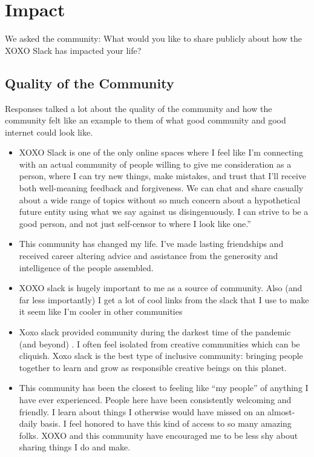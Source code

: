 \documentclass[
]{book}
\providecommand{\tightlist}{%
  \setlength{\itemsep}{0pt}\setlength{\parskip}{0pt}}
\begin{document}
\chapter{Impact}\label{impact}

We asked the community: What would you like to share publicly about how the XOXO Slack has impacted your life?

\section{Quality of the Community}\label{quality-of-the-community}

Responses talked a lot about the quality of the community and how the community felt like an example to them of what good community and good internet could look like.

\begin{itemize}
\tightlist
\item
  XOXO Slack is one of the only online spaces where I feel like I'm connecting with an actual community of people willing to give me consideration as a person, where I can try new things, make mistakes, and trust that I'll receive both well-meaning feedback and forgiveness. We can chat and share casually about a wide range of topics without so much concern about a hypothetical future entity using what we say against us disingenuously. I can strive to be a good person, and not just self-censor to where I look like one.''
\item
  This community has changed my life. I've made lasting friendships and received career altering advice and assistance from the generosity and intelligence of the people assembled.
\item
  XOXO slack is hugely important to me as a source of community. Also (and far less importantly) I get a lot of cool links from the slack that I use to make it seem like I'm cooler in other communities
\item
  Xoxo slack provided community during the darkest time of the pandemic (and beyond) . I often feel isolated from creative communities which can be cliquish. Xoxo slack is the best type of inclusive community: bringing people together to learn and grow as responsible creative beings on this planet.
\item
  This community has been the closest to feeling like ``my people'' of anything I have ever experienced. People here have been consistently welcoming and friendly. I learn about things I otherwise would have missed on an almost-daily basis. I feel honored to have this kind of access to so many amazing folks. XOXO and this community have encouraged me to be less shy about sharing things I do and make.

\end{itemize}
\end{document}

